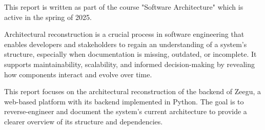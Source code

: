 This report is written as part of the course "Software Architecture" which is active in the spring of 2025.

Architectural reconstruction is a crucial process in software engineering that enables developers and stakeholders to regain an understanding of a system’s structure, especially when documentation is missing, outdated, or incomplete. It supports maintainability, scalability, and informed decision-making by revealing how components interact and evolve over time.

This report focuses on the architectural reconstruction of the backend of Zeegu, a web-based platform with its backend implemented in Python. The goal is to reverse-engineer and document the system’s current architecture to provide a clearer overview of its structure and dependencies.
